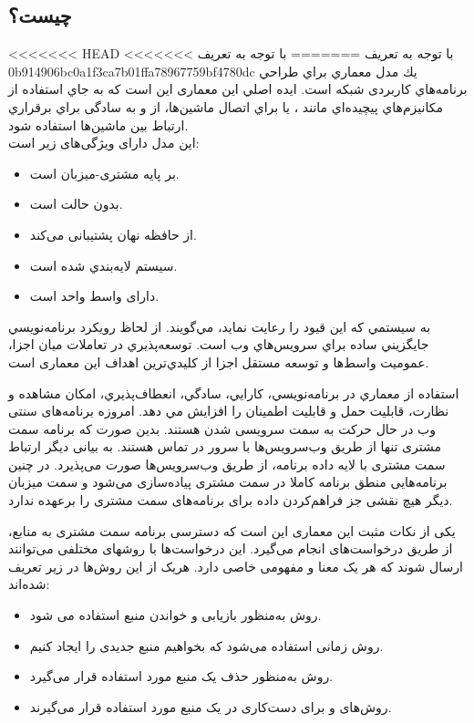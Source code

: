 {{\subsection{ چیست؟}
<<<<<<< HEAD
با توجه به تعریف
=======
با توجه به تعریف \cite{REST}
>>>>>>> 0b914906bc0a1f3ca7b01ffa78967759bf4780dc
 يك مدل معماري براي طراحي برنامه‌هاي كاربردی شبكه است. ايده اصلي این معماری اين است كه به جاي استفاده از مكانيزم‌هاي پيچيده‌اي مانند ،  يا  براي اتصال ماشين‌ها، از  و به سادگی براي برقراري ارتباط بين ماشين‌ها استفاده شود.\\
این مدل دارای ویژگی‌های زیر است: 
\begin{itemize}
	\item بر پایه مشتری-میزبان است.
	\item بدون حالت است.
	\item از حافظه نهان پشتیبانی می‌کند.
	\item سيستم لايه‌بندي شده است.
    \item دارای واسط واحد است.
\end{itemize}
 
به سيستمي كه اين قيود را رعايت نمايد،  مي‌گويند. از لحاظ رويكرد برنامه‌نويسي  جايگزيني ساده براي سرويس‌هاي وب است. توسعه‌پذيري در تعاملات ميان اجزا، عموميت واسط‌ها و توسعه مستقل اجزا از كليدي‌ترين اهداف این معماری است.

استفاده از معماري  در برنامه‌نويسي، كارايي، سادگي، انعطاف‌پذيري، امكان مشاهده و نظارت، قابليت حمل و قابليت اطمينان را افزايش مي دهد.
امروزه برنامه‌های سنتی وب در حال حرکت به سمت سرویسی شدن هستند. بدین صورت که برنامه سمت مشتری تنها از طریق وب‌سرویس‌ها با سرور در تماس هستند. به بیانی دیگر ارتباط سمت مشتری با لایه داده برنامه، از طریق وب‌سرویس‌ها صورت می‌پذیرد. در چنین برنامه‌هایی منطق برنامه کاملا در سمت مشتری پیاده‌سازی می‌شود و سمت میزبان دیگر هیچ نقشی جز فراهم‌کردن داده برای برنامه‌های سمت مشتری را برعهده ندارد.
 
یکی از نکات مثبت این معماری این است که دسترسی برنامه سمت مشتری به منابع، از طریق درخواست‌های  انجام می‌گیرد. این درخواست‌ها با روشهای مختلفی می‌توانند ارسال شوند که هر یک معنا و مفهومی خاصی دارد. هریک از این روش‌ها در زیر تعریف شده‌اند:
\begin{itemize}
	\item روش  به‌منظور بازیابی و خواندن منبع استفاده می شود.
	\item روش  زمانی استفاده می‌شود که بخواهیم منبع جدیدی را ایجاد کنیم.
	\item روش  به‌منظور حذف یک منبع مورد استفاده قرار می‌گیرد.
	\item روش‌های  و  برای دست‌کاری در یک منبع مورد استفاده قرار می‌گیرند.
\end{itemize}


}}

